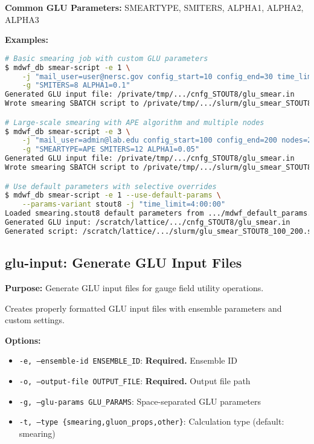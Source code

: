 \documentclass{article}
\begin{document}
\textbf{Common GLU Parameters:}
SMEARTYPE, SMITERS, ALPHA1, ALPHA2, ALPHA3

\textbf{Examples:}
\begin{lstlisting}[language=bash]
# Basic smearing job with custom GLU parameters
$ mdwf_db smear-script -e 1 \
    -j "mail_user=user@nersc.gov config_start=10 config_end=30 time_limit=3:00:00" \
    -g "SMITERS=8 ALPHA1=0.1"
Generated GLU input file: /private/tmp/.../cnfg_STOUT8/glu_smear.in
Wrote smearing SBATCH script to /private/tmp/.../slurm/glu_smear_STOUT8_10_30.sh

# Large-scale smearing with APE algorithm and multiple nodes
$ mdwf_db smear-script -e 3 \
    -j "mail_user=admin@lab.edu config_start=100 config_end=200 nodes=2 time_limit=8:00:00" \
    -g "SMEARTYPE=APE SMITERS=12 ALPHA1=0.05"
Generated GLU input file: /private/tmp/.../cnfg_STOUT8/glu_smear.in
Wrote smearing SBATCH script to /private/tmp/.../slurm/glu_smear_STOUT8_100_200.sh

# Use default parameters with selective overrides
$ mdwf_db smear-script -e 1 --use-default-params \
    --params-variant stout8 -j "time_limit=4:00:00"
Loaded smearing.stout8 default parameters from .../mdwf_default_params.yaml
Generated GLU input: /scratch/lattice/.../cnfg_STOUT8/glu_smear.in
Generated script: /scratch/lattice/.../slurm/glu_smear_STOUT8_100_200.sh
\end{lstlisting}

\subsection{glu-input: Generate GLU Input Files}

\textbf{Purpose:} Generate GLU input files for gauge field utility operations.

Creates properly formatted GLU input files with ensemble parameters and custom settings.

\textbf{Options:}
\begin{itemize}
\item \texttt{-e, --ensemble-id ENSEMBLE\_ID}: \textbf{Required.} Ensemble ID
\item \texttt{-o, --output-file OUTPUT\_FILE}: \textbf{Required.} Output file path
\item \texttt{-g, --glu-params GLU\_PARAMS}: Space-separated GLU parameters
\item \texttt{-t, --type \{smearing,gluon\_props,other\}}: Calculation type (default: smearing)
\end{itemize}
\end{document}
